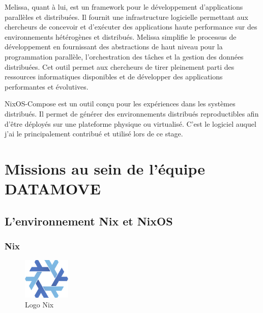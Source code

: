\documentclass[a4paper,french,12pt, titlepage]{article}
\begin{document}
Melissa, quant à lui, est un framework pour le développement
d'applications parallèles et distribuées. Il fournit une infrastructure
logicielle permettant aux chercheurs de concevoir et d'exécuter des
applications haute performance sur des environnements hétérogènes et
distribués. Melissa simplifie le processus de développement en
fournissant des abstractions de haut niveau pour la programmation
parallèle, l'orchestration des tâches et la gestion des données
distribuées. Cet outil permet aux chercheurs de tirer pleinement parti
des ressources informatiques disponibles et de développer des
applications performantes et évolutives.\newline

NixOS-Compose est un outil conçu pour les expériences dans les systèmes
distribués. Il permet de générer des environnements distribués
reproductibles afin d'être déployés sur une plateforme physique ou
virtualisé. C'est le logiciel auquel j'ai le principalement contribué et
utilisé lors de ce stage.

\newpage

\hypertarget{missions-au-sein-de-luxe9quipe-datamove}{%
\section{Missions au sein de l'équipe
DATAMOVE}\label{missions-au-sein-de-luxe9quipe-datamove}}

\hypertarget{lenvironnement-nix-et-nixos}{%
\subsection{L'environnement Nix et
NixOS}\label{lenvironnement-nix-et-nixos}}

\hypertarget{nix}{%
\subsubsection{Nix}\label{nix}}

\begin{figure}[h]
\centering
\includegraphics[width=0.2\textwidth,height=0.2\textheight,keepaspectratio]{logos/nixlogo.png}
\caption{Logo Nix}
\end{figure}
\end{document}

